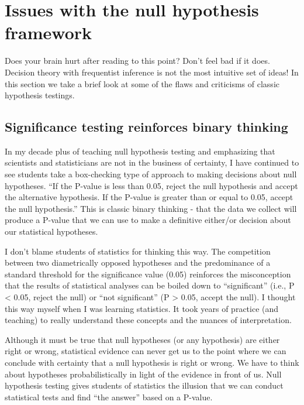 \documentclass[
]{book}
\begin{document}
\section{Issues with the null hypothesis framework}\label{issues-with-the-null-hypothesis-framework}

Does your brain hurt after reading to this point? Don't feel bad if it does. Decision theory with frequentist inference is not the most intuitive set of ideas! In this section we take a brief look at some of the flaws and criticisms of classic hypothesis testings.

\subsection{Significance testing reinforces binary thinking}\label{significance-testing-reinforces-binary-thinking}

In my decade plus of teaching null hypothesis testing and emphasizing that scientists and statisticians are not in the business of certainty, I have continued to see students take a box-checking type of approach to making decisions about null hypotheses. ``If the P-value is less than 0.05, reject the null hypothesis and accept the alternative hypothesis. If the P-value is greater than or equal to 0.05, accept the null hypothesis.'' This is classic binary thinking - that the data we collect will produce a P-value that we can use to make a definitive either/or decision about our statistical hypotheses.

I don't blame students of statistics for thinking this way. The competition between two diametrically opposed hypotheses and the predominance of a standard threshold for the significance value (0.05) reinforces the misconception that the results of statistical analyses can be boiled down to ``significant'' (i.e., P \textless{} 0.05, reject the null) or ``not significant'' (P \textgreater{} 0.05, accept the null). I thought this way myself when I was learning statistics. It took years of practice (and teaching) to really understand these concepts and the nuances of interpretation.

Although it must be true that null hypotheses (or any hypothesis) are either right or wrong, statistical evidence can never get us to the point where we can conclude with certainty that a null hypothesis is right or wrong. We have to think about hypotheses probabilistically in light of the evidence in front of us. Null hypothesis testing gives students of statistics the illusion that we can conduct statistical tests and find ``the answer'' based on a P-value.
\end{document}
